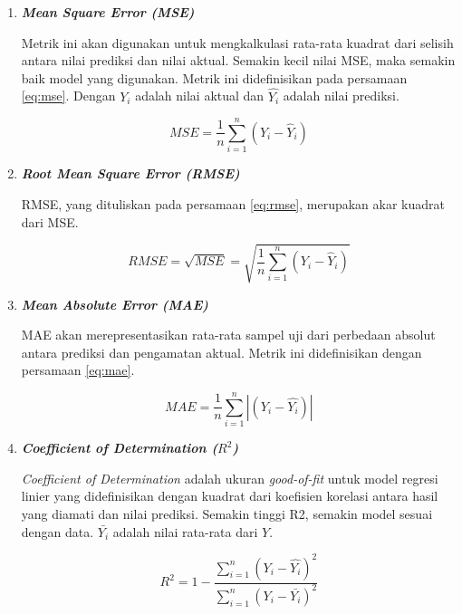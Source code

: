 \begin{enumerate}
  \item \textbf{\textit{Mean Square Error (MSE)}}

        Metrik ini akan digunakan untuk mengkalkulasi rata-rata kuadrat dari selisih antara nilai prediksi dan nilai aktual. Semakin kecil nilai MSE, maka semakin baik model yang digunakan. Metrik ini didefinisikan pada persamaan \ref{eq:mse}. Dengan $Y_i$ adalah nilai aktual dan $\hat{Y_i}$ adalah nilai prediksi.

        \begin{equation}
          \label{eq:mse}
          MSE = \frac{1}{n}\sum_{i=1}^{n}(Y_i-\hat{Y}_i)
        \end{equation}

  \item \textbf{\textit{Root Mean Square Error (RMSE)}}

        RMSE, yang dituliskan pada persamaan \ref{eq:rmse}, merupakan akar kuadrat dari MSE.

        \begin{equation}
          \label{eq:rmse}
          RMSE = \sqrt{MSE} = \sqrt{\frac{1}{n}\sum_{i=1}^{n}(Y_i-\hat{Y}_i)}
        \end{equation}

  \item \textbf{\textit{Mean Absolute Error (MAE)}}

        MAE akan merepresentasikan rata-rata sampel uji dari perbedaan absolut antara prediksi dan pengamatan aktual. Metrik ini didefinisikan dengan persamaan \ref{eq:mae}.

        \begin{equation}
          \label{eq:mae}
          MAE = \frac{1}{n}\sum_{i=1}^{n}|(Y_i-\hat{Y_i})|
        \end{equation}

  \item \textbf{\textit{Coefficient of Determination ($R^{2}$)}}

        \textit{Coefficient of Determination} adalah ukuran \textit{good-of-fit} untuk model regresi linier yang didefinisikan dengan kuadrat dari koefisien korelasi antara hasil yang diamati dan nilai prediksi. Semakin tinggi R2, semakin model sesuai dengan data. $\bar{Y_i}$ adalah nilai rata-rata dari $Y$.

        \begin{equation}
          \label{eq:r2}
          R^{2} = 1-\frac{\sum_{i=1}^{n}(Y_i-\hat{Y_i})^{2}}{\sum_{i=1}^{n}(Y_i-\bar{Y_i})^{2}}
        \end{equation}
\end{enumerate}

